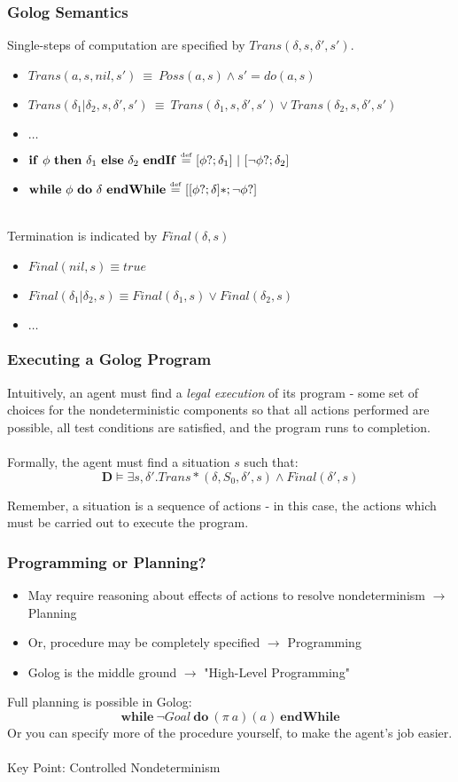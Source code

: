 \documentclass{beamer}
\newcommand{\isdef}{\hbox{$\stackrel{\mbox{\tiny def}}{=}$}}
\begin{document}
\begin{frame}
\frametitle{Golog Semantics}
Single-steps of computation are specified by  $Trans(\delta,s,\delta',s')$.
\begin{itemize}
  \item $Trans(a,s,nil,s')\ \equiv\ Poss(a,s)\wedge s'=do(a,s)$
  \item $Trans(\delta_1|\delta_2,s,\delta',s')\ \equiv\ Trans(\delta_1,s,\delta',s')\vee Trans(\delta_2,s,\delta',s')$
  \item $\dots$
  \pause
  \item $\mathbf{if}\ \phi\ \mathbf{then}\ \delta_1\ \mathbf{else}\ \delta_2\ \mathbf{endIf}\ \isdef\ [\phi?;\delta_1]\ |\ [\neg\phi?;\delta_2]$
  \pause
  \item $\mathbf{while}\ \phi\ \mathbf{do}\ \delta\ \mathbf{endWhile}\ \isdef\ [[\phi?;\delta]*;\neg\phi?]$
\end{itemize}
\ \\
\pause
Termination is indicated by $Final(\delta,s)$
\begin{itemize}
  \item $Final(nil,s) \equiv true$
  \item $Final(\delta_1|\delta_2,s) \equiv Final(\delta_1,s)\vee Final(\delta_2,s)$
  \item $\dots$
\end{itemize}
\end{frame}

\begin{frame}
\frametitle{Executing a Golog Program}
Intuitively, an agent must find a \emph{legal execution} of its program - some set of choices for the nondeterministic components so that all
actions performed are possible, all test conditions are satisfied, and the
program runs to completion.\\
\ \\
Formally, the agent must find a situation $s$ such that:\[
\mathbf{D} \models \exists s,\delta' . Trans*(\delta,S_0,\delta',s) \wedge Final(\delta',s)\]

Remember, a situation is a sequence of actions - in this case, the actions which must be carried out to execute the program.
\end{frame}

\begin{frame}
\frametitle{Programming or Planning?}
\begin{itemize}
  \item May require reasoning about effects of actions to resolve nondeterminism
$\rightarrow$ Planning
  \item Or, procedure may be completely specified $\rightarrow$ Programming
  \item Golog is the middle ground $\rightarrow$ "High-Level Programming"
\end{itemize}
\pause
Full planning is possible in Golog:\[
\mathbf{while}\ \neg Goal\ \mathbf{do}\ (\pi\ a)(a)\ \mathbf{endWhile}\]
\pause
Or you can specify more of the procedure yourself, to make the agent's job
easier.\\
\ \\
Key Point: \alert{Controlled} Nondeterminism
\end{frame}
\end{document}
